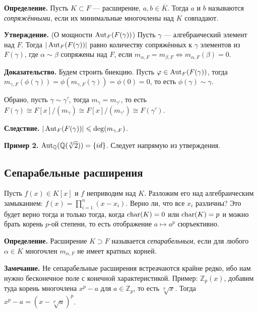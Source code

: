 \textbf{Определение.} Пусть $K \subset F$ --- расширение, $a, b \in \overline K$.
Тогда $a$ и $b$ называются \textit{сопряжёнными}, если их минимальные многочлены над $K$ совпадают.

\textbf{Утверждение.} (О мощности $\operatorname{Aut}_F(F(\gamma))$) Пусть $\gamma$ --- алгебраический элемент над $F$.
Тогда $|\operatorname{Aut}_F(F(\gamma))|$ равно количеству сопряжённых к $\gamma$ элементов из $F(\gamma)$, где $\alpha \sim \beta$ сопряжены над $F$, если $m_{\alpha, F} = m_{\beta, F} \iff m_{\alpha, F}(\beta) = 0$.

\textbf{Доказательство.} Будем строить биекцию.
Пусть $\varphi \in \operatorname{Aut}_F(F(\gamma))$, тогда $m_{\gamma, F}(\phi(\gamma)) = \phi(m_{\gamma, F}(\gamma)) = \phi(0) = 0$, то есть $\phi(\gamma) \sim \gamma$.

Обрано, пусть $\gamma \sim \gamma'$, тогда $m_{\gamma} = m_{\gamma'}$, то есть $F(\gamma) \cong F[x] / (m_\gamma) \cong F[x] / (m_{\gamma'}) \cong F(\gamma')$.

\QED

\textbf{Следствие.} $|\operatorname{Aut}_F(F(\gamma))| \leqslant \deg(m_{\gamma, F})$.

\textbf{Пример 2.} $\operatorname{Aut}_{\mathbb Q}(\mathbb Q(\sqrt[3]{2})) = \{id\}$.
Следует напрямую из утверждения.

\subsection{Сепарабельные расширения}
Пусть $f(x) \in K[x]$ и $f$ неприводим над $K$.
Разложим его над алгебраическим замыканием: $f(x) = \prod_{i=1}^n (x - x_i)$.
Верно ли, что все $x_i$ различны?
Это будет верно тогда и только тогда, когда $\operatorname{char}(K) = 0$ или $\operatorname{char}(K) = p$ и можно брать корень $p$-ой степени, то есть отображение $a \mapsto a^p$ сюръективно.

\textbf{Определение.} Расширение $K \supset F$ называется \textit{сепарабельным}, если для любого $\alpha \in K$ многочлен $m_{\alpha, F}$ не имеет кратных корней.

\textbf{Замечание.} Не сепарабельные расширения встреачаются крайне редко, ибо нам нужно бесконечное поле с конечной характеристикой.
Пример: $\mathbb Z_p(x)$, добавим туда корень многочлена $x^p - a$ для $a \in \mathbb Z_p$, то есть $\sqrt[p]{x}$.
Тогда $x^p - a = (x - \sqrt[p]{a})^p$.


